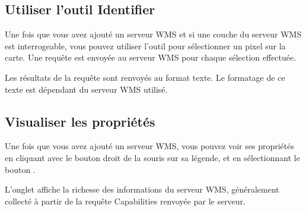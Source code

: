 \subsection{Utiliser l'outil Identifier}\label{sec:ogc-wms-identify}

Une fois que vous avez ajouté un serveur WMS et si une couche du serveur WMS
est interrogeable, vous pouvez utiliser l'outil 
 pour sélectionner un pixel sur la
carte. Une requête est envoyée au serveur WMS pour chaque sélection effectuée.

Les résultats de la requête sont renvoyés au format texte. Le formatage de ce
texte est dépendant du serveur WMS utilisé.

\subsection{Visualiser les propriétés}
\label{sec:ogc-wms-properties}

Une fois que vous avez ajouté un serveur WMS, vous pouvez voir ses propriétés
en cliquant avec le bouton droit de la souris sur sa légende, et en
sélectionnant le bouton  .

\label{sec:ogc-wms-properties-metadata}

L'onglet  affiche la richesse des informations du serveur WMS,
généralement collecté à partir de la requête Capabilities renvoyée par le
serveur.

